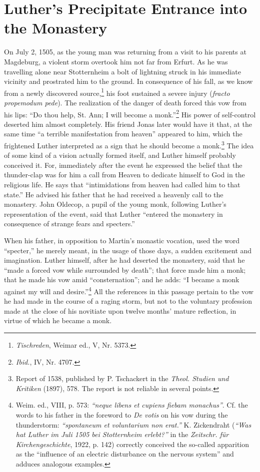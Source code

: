 \section{Luther's Precipitate Entrance into the Monastery}

On July 2, 1505, as the young man was returning from a visit
to his parents at Magdeburg, a violent storm overtook him not far
from Erfurt. As he was travelling alone near Stotternheim a bolt
of lightning struck in his immediate vicinity and prostrated him
to the ground. In consequence of his fall, as we know from a newly
discovered source,\footnote{\textit{Tischreden}, Weimar ed., V, Nr. 5373.}
his foot sustained a severe injury (\textit{fracto propemodum pede}).
The realization of the danger of death forced this vow
from his lips: “Do thou help, St. Ann; I will become a monk.”\footnote{\textit{Ibid.}, IV, Nr. 4707.}
His power of self-control deserted him almost completely. His friend
Jonas later would have it that, at the same time “a terrible manifestation
from heaven” appeared to him, which the frightened Luther interpreted
as a sign that he should become a monk.\footnote
{Report of 1538, published by P. Tschackert in the \textit{Theol. Studien und Kritiken}
(1897), 578. The report is not reliable in several points.}
The idea of some
kind of a vision actually formed itself, and Luther himself probably
conceived it. For, immediately after the event he expressed the belief
that the thunder-clap was for him a call from Heaven to dedicate
himself to God in the religious life. He says that “intimidations from
heaven had called him to that state.” He advised his father that he had
received a heavenly call to the monastery. John Oldecop, a pupil of
the young monk, following Luther’s representation of the event, said
that Luther “entered the monastery in consequence of strange fears
and specters.”

When his father, in opposition to Martin’s monastic vocation, used
the word “specter,” he merely meant, in the usage of those days, a
sudden excitement and imagination. Luther himself, after he had
deserted the monastery, said that he “made a forced vow while surrounded
by death”; that force made him a monk; that he made
his vow amid “consternation”; and he adds: “I became a monk
against my will and desire.”\footnote
{Weim. ed., VIII, p. 573: \textit{“neque libens et cupiens fiebam monachus”}. Cf. the words
to his father in the foreword to \textit{De votis} on his vow during the thunderstorm:
\textit{``spontaneum et voluntarium non erat.''} K. Zickendraht (\textit{``Was hat Luther im Juli 1505 bei
Stotternheim erlebt?''} in the \textit{Zeitschr. für Kirchengeschichte}, 1922, p. 142) correctly conceived
the so-called apparition as the “influence of an electric disturbance on the nervous
system” and adduces analogous examples.}
All the references in this passage pertain
to the vow he had made in the course of a raging storm, but
not to the voluntary profession made at the close of his novitiate upon
twelve months’ mature reflection, in virtue of which he became a monk.

